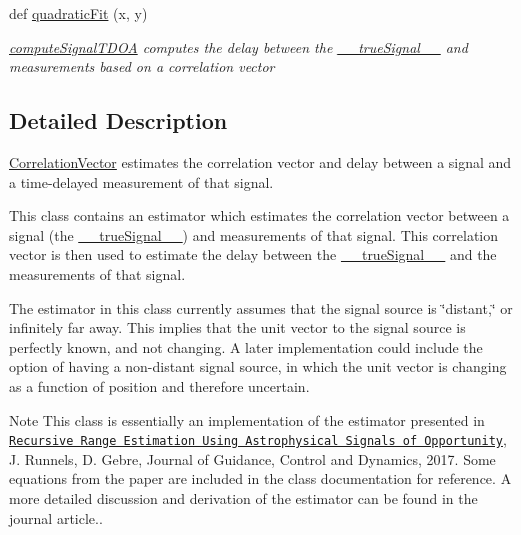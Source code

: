 \begin{DoxyCompactItemize}
def \hyperlink{classmodest_1_1substates_1_1correlationvector_1_1CorrelationVector_a58c37e99568498d7609e3e5ccb7b2630}{quadratic\+Fit} (x, y)
\begin{DoxyCompactList}\small\item\em \hyperlink{classmodest_1_1substates_1_1correlationvector_1_1CorrelationVector_a93ab1b2a798ddca9f1557557c7bc35fc}{compute\+Signal\+T\+D\+OA} computes the delay between the \hyperlink{classmodest_1_1substates_1_1correlationvector_1_1CorrelationVector_af2f52cea1c695f36dd100f529c322e94}{\+\_\+\+\_\+true\+Signal\+\_\+\+\_\+} and measurements based on a correlation vector \end{DoxyCompactList}\end{DoxyCompactItemize}


\subsection{Detailed Description}
\hyperlink{classmodest_1_1substates_1_1correlationvector_1_1CorrelationVector}{Correlation\+Vector} estimates the correlation vector and delay between a signal and a time-\/delayed measurement of that signal. 

This class contains an estimator which estimates the correlation vector between a signal (the \hyperlink{classmodest_1_1substates_1_1correlationvector_1_1CorrelationVector_af2f52cea1c695f36dd100f529c322e94}{\+\_\+\+\_\+true\+Signal\+\_\+\+\_\+}) and measurements of that signal. This correlation vector is then used to estimate the delay between the \hyperlink{classmodest_1_1substates_1_1correlationvector_1_1CorrelationVector_af2f52cea1c695f36dd100f529c322e94}{\+\_\+\+\_\+true\+Signal\+\_\+\+\_\+} and the measurements of that signal.

The estimator in this class currently assumes that the signal source is \char`\"{}distant,\char`\"{} or infinitely far away. This implies that the unit vector to the signal source is perfectly known, and not changing. A later implementation could include the option of having a non-\/distant signal source, in which the unit vector is changing as a function of position and therefore uncertain.

\begin{DoxyNote}{Note}
This class is essentially an implementation of the estimator presented in \href{https://doi.org/10.2514/1.G002650}{\tt Recursive Range Estimation Using Astrophysical Signals of Opportunity}, J. Runnels, D. Gebre, Journal of Guidance, Control and Dynamics, 2017. Some equations from the paper are included in the class documentation for reference. A more detailed discussion and derivation of the estimator can be found in the journal article.. 
\end{DoxyNote}


